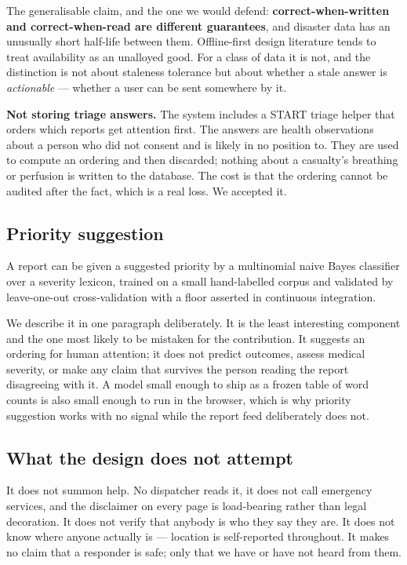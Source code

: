The generalisable claim, and the one we would defend:
\textbf{correct-when-written and correct-when-read are different
guarantees}, and disaster data has an unusually short half-life between
them. Offline-first design literature tends to treat availability as an
unalloyed good. For a class of data it is not, and the distinction is
not about staleness tolerance but about whether a stale answer is
\emph{actionable} --- whether a user can be sent somewhere by it.

\textbf{Not storing triage answers.} The system includes a START triage
helper that orders which reports get attention first. The answers are
health observations about a person who did not consent and is likely in
no position to. They are used to compute an ordering and then discarded;
nothing about a casualty's breathing or perfusion is written to the
database. The cost is that the ordering cannot be audited after the
fact, which is a real loss. We accepted it.

\subsection{Priority suggestion}

A report can be given a suggested priority by a multinomial naive Bayes
classifier over a severity lexicon, trained on a small hand-labelled
corpus and validated by leave-one-out cross-validation with a floor
asserted in continuous integration.

We describe it in one paragraph deliberately. It is the least
interesting component and the one most likely to be mistaken for the
contribution. It suggests an ordering for human attention; it does not
predict outcomes, assess medical severity, or make any claim that
survives the person reading the report disagreeing with it. A model
small enough to ship as a frozen table of word counts is also small
enough to run in the browser, which is why priority suggestion works
with no signal while the report feed deliberately does not.

\subsection{What the design does not attempt}

It does not summon help. No dispatcher reads it, it does not call
emergency services, and the disclaimer on every page is load-bearing
rather than legal decoration. It does not verify that anybody is who
they say they are. It does not know where anyone actually is ---
location is self-reported throughout. It makes no claim that a responder
is safe; only that we have or have not heard from them.

